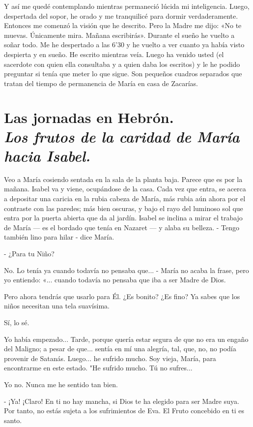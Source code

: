 \documentclass[12pt]{book} %
\begin{document}
Y así me quedé contemplando mientras permaneció lúcida mi inteligencia. Luego, despertada del sopor, he orado y me tranquilicé para dormir verdaderamente. Entonces me comenzó la visión que he descrito. Pero la Madre me dijo: «No te muevas. Únicamente mira. Mañana escribirás». Durante el sueño he vuelto a soñar todo. Me he despertado a las 6'30 y he vuelto a ver cuanto ya había visto despierta y en sueño. He escrito mientras veía. Luego ha venido usted (el sacerdote con quien ella consultaba y a quien daba los escritos) y le he podido preguntar si tenía que meter lo que sigue. Son pequeños cuadros separados que tratan del tiempo de permanencia de María en casa de Zacarías. 

\chapter*{Las jornadas en Hebrón. \\ \normalfont\normalsize\textit{Los frutos de la caridad de María hacia Isabel.}}
 
Veo a María cosiendo sentada en la sala de la planta baja. Parece que es por la mañana. Isabel va y viene, ocupándose de la casa. Cada vez que entra, se acerca a depositar una caricia en la rubia cabeza de María, más rubia aún ahora por el contraste con las paredes; más bien oscuras, y bajo el rayo del luminoso sol que entra por la puerta abierta que da al jardín. Isabel se inclina a mirar el trabajo de María — es el bordado que tenía en Nazaret — y alaba su belleza. - Tengo también lino para hilar - dice María. 

- ¿Para tu Niño? 

No. Lo tenía ya cuando todavía no pensaba que... - María no acaba la frase, pero yo entiendo: «... cuando todavía no pensaba que iba a ser Madre de Dios. 

Pero ahora tendrás que usarlo para Él. ¿Es bonito? ¿Es fino? Ya sabes que los niños necesitan una tela suavísima. 

Sí, lo sé. 

Yo había empezado... Tarde, porque quería estar segura de que no era un engaño del Maligno; a pesar de que... sentía en mí una alegría, tal, que, no, no podía provenir de Satanás. Luego... he sufrido mucho. Soy vieja, María, para encontrarme en este estado. "He sufrido mucho. Tú no sufres... 

Yo no. Nunca me he sentido tan bien. 

- ¡Ya! ¡Claro! En ti no hay mancha, si Dios te ha elegido para ser Madre suya. Por tanto, no estás sujeta a los sufrimientos de Eva. El Fruto concebido en ti es santo. 
\end{document}

